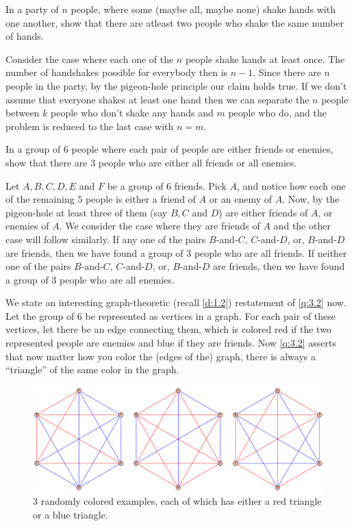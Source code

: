 \begin{question}
In a party of $n$ people, where some (maybe all, maybe none) shake hands with one another, show that there are atleast two people who shake the same number of hands.
\end{question}
\begin{solution}
Consider the case where each one of the $n$ people shake hands at least once. The number of handshakes possible for everybody then is $n-1$. Since there are $n$ people in the party, by the pigeon-hole principle our claim holds true. If we don't assume that everyone shakes at least one hand then we can separate the $n$ people between $k$ people who don't shake any hands and $m$ people who do, and the problem is reduced to the last case with $n=m$.
\end{solution}
\begin{question}
In a group of $6$ people where each pair of people are either friends or enemies, show that there are $3$ people who are either all friends or all enemies. 
\label{q:3.2}
\end{question}
\begin{solution}
Let $A,B,C,D,E$ and $F$ be a group of $6$ friends. Pick $A$, and notice how each one of the remaining $5$ people is either a friend of $A$ or an enemy of $A$. Now, by the pigeon-hole at least three of them (say $B,C$ and $D$) are either friends of $A$, or enemies of $A$. We consider the case where they are friends of $A$ and the other case will follow similarly. If any one of the pairs $B$-and-$C$, $C$-and-$D$, or, $B$-and-$D$ are friends, then we have found a group of $3$ people who are all friends. If neither one of the pairs $B$-and-$C$, $C$-and-$D$, or, $B$-and-$D$ are friends, then we have found a group of $3$ people who are all enemies.
\end{solution}
We state an interesting graph-theoretic (recall \cref{d:1.2}) restatement of \cref{q:3.2} now. Let the group of $6$ be represented as vertices in a graph. For each pair of these vertices, let there be an edge connecting them, which is colored red if the two represented people are enemies and blue if they are friends. Now \cref{q:3.2} asserts that now matter how you color the (edges of the) graph, there is always a ``triangle'' of the same color in the graph. 
\begin{figure}[H]
    \centering
    \includegraphics[width=0.9\linewidth]{Images/Figure10.png}
    \caption{3 randomly colored examples, each of which has either a red triangle or a blue triangle.}
    \label{f:10}
\end{figure}
